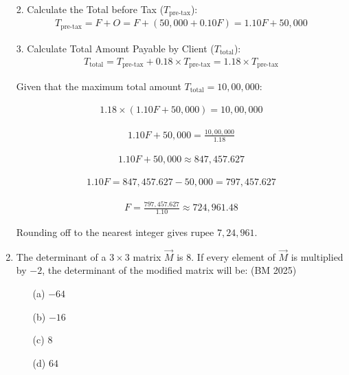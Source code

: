 \begin{enumerate}[label=\thesubsection.\arabic*, ref=\thesubsection.\theenumi]
2. Calculate the Total before Tax ($T_{\text{pre-tax}}$):
\begin{align}
T_{\text{pre-tax}} = F + O = F + (50,000 + 0.10F) = 1.10F + 50,000
\end{align}

3. Calculate Total Amount Payable by Client ($T_{\text{total}}$):
\begin{align}
T_{\text{total}} = T_{\text{pre-tax}} + 0.18 \times T_{\text{pre-tax}} = 1.18 \times T_{\text{pre-tax}}
\end{align}

Given that the maximum total amount $T_{\text{total}} = 10,00,000$:

\begin{align}
1.18 \times (1.10F + 50,000) = 10,00,000
\end{align}

\begin{align}
1.10F + 50,000 = \frac{10,00,000}{1.18}
\end{align}

\begin{align}
1.10F + 50,000 \approx 847,457.627
\end{align}

\begin{align}
1.10F = 847,457.627 - 50,000 = 797,457.627
\end{align}

\begin{align}
F = \frac{797,457.627}{1.10} \approx 724,961.48
\end{align}

Rounding off to the nearest integer gives $\text{rupee } 7,24,961$.


\item The determinant of a $3 \times 3$ matrix $\vec{M}$ is $8$. If every element of $\vec{M}$ is multiplied by $-2$, the determinant of the modified matrix will be:
\hfill (BM 2025)
\begin{multicols}{2}
\begin{enumerate}
\setlength{\itemsep}{0pt}
    \item[(a)] $-64$
    \item[(b)] $-16$
    \item[(c)] $8$
    \item[(d)] $64$
\end{enumerate}
\end{multicols}

\solution
    

\end{enumerate}
